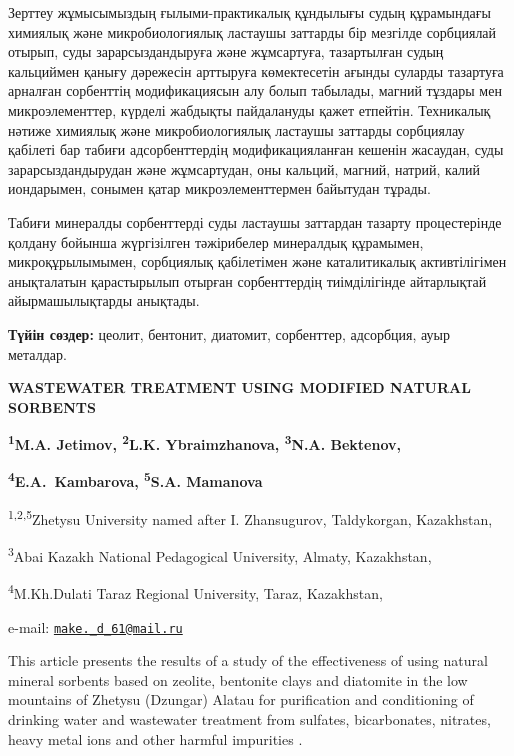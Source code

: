 Зерттеу жұмысымыздың ғылыми-практикалық құндылығы судың құрамындағы
химиялық және микробиологиялық ластаушы заттарды бір мезгілде сорбциялай
отырып, суды зарарсыздандыруға және жұмсартуға, тазартылған судың
кальциймен қанығу дәрежесін арттыруға көмектесетін ағынды суларды
тазартуға арналған сорбенттің модификациясын алу болып табылады, магний
тұздары мен микроэлементтер, күрделі жабдықты пайдалануды қажет
етпейтін. Техникалық нәтиже химиялық және микробиологиялық ластаушы
заттарды сорбциялау қабілеті бар табиғи адсорбенттердің
модификацияланған кешенін жасаудан, суды зарарсыздандырудан және
жұмсартудан, оны кальций, магний, натрий, калий иондарымен, сонымен
қатар микроэлементтермен байытудан тұрады.

Табиғи минералды сорбенттерді суды ластаушы заттардан тазарту
процестерінде қолдану бойынша жүргізілген тәжірибелер минералдық
құрамымен, микроқұрылымымен, сорбциялық қабілетімен және каталитикалық
активтілігімен анықталатын қарастырылып отырған сорбенттердің
тиімділігінде айтарлықтай айырмашылықтарды анықтады.

{\bfseries Түйін сөздер:} цеолит, бентонит, диатомит, сорбенттер,
адсорбция, ауыр металдар.

\begin{articleheader}
{\bfseries WASTEWATER TREATMENT USING MODIFIED NATURAL SORBENTS}

{\bfseries \textsuperscript{1}M.A. Jetimov\textsuperscript{\envelope },
\textsuperscript{2}L.K. Ybraimzhanova, \textsuperscript{3}N.A.
Bektenov,}

{\bfseries \textsuperscript{4}E.A.~Kambarova, \textsuperscript{5}S.A.
Mamanova}
\end{articleheader}

\begin{affiliation}
\textsuperscript{1,2,5}Zhetysu University named after I. Zhansugurov,
Taldykorgan, Kazakhstan,

\textsuperscript{3}Abai Kazakh National Pedagogical University, Almaty,
Kazakhstan,

\textsuperscript{4}M.Kh.Dulati Taraz Regional University, Taraz,
Kazakhstan,

e-mail: \href{mailto:make._d_61@mail.ru}{\nolinkurl{make.\_d\_61@mail.ru}}
\end{affiliation}

This article presents the results of a study of the effectiveness of
using natural mineral sorbents based on zeolite, bentonite clays and
diatomite in the low mountains of Zhetysu (Dzungar) Alatau for
purification and conditioning of drinking water and wastewater treatment
from sulfates, bicarbonates, nitrates, heavy metal ions and other
harmful impurities .

